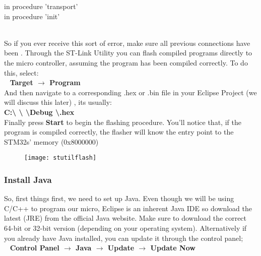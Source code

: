 {\color{Red}
in procedure 'transport'\\
in procedure 'init'{
\\
\color{Black} So if you ever receive this sort of error, make sure all previous connections have been \textbf{\underline{}}.
\newpage
\justifying
Through the ST-Link Utility you can flash compiled programs directly to the micro controller, assuming the program has been compiled correctly. To do this, select:\\
\-\ \hspace{20pt} \textbf{\color{YellowGreen} Target $\rightarrow$ Program}\\
And then navigate to a corresponding .hex or .bin file in your Eclipse Project (we will discuss this later) , its usually:\\ \textbf{\color{Aquamarine} C:\textbackslash <Eclipse Workspace> \textbackslash <Eclipse Project Name> \textbackslash Debug \textbackslash <Eclipse Project Name>.hex}\\
Finally press \textbf{\color{Purple} Start} to begin the flashing procedure. You'll notice that, if the program is compiled correctly, the flasher will know the entry point to the STM32s' memory (0x8000000) 
\\
\begin{figure}[htbp]
\centering
\texttt{[image: stutilflash]}
\end{figure}
\justifying
\par
\subsubsection{Install Java}
So, first things first, we need to set up Java. Even though we will be using C/C++ to program our micro, Eclipse is an inherent Java IDE so download the latest {\color{Blue}\underline{}} (JRE) from the official Java website. Make sure to download the correct 64-bit or 32-bit version (depending on your operating system). 
Alternatively if you already have Java installed, you can update it through the control panel;\\
\-\ \hspace{20pt}\textbf{\color{Green} Control Panel $\rightarrow$ Java $\rightarrow$ Update $\rightarrow$ Update Now}
}}

